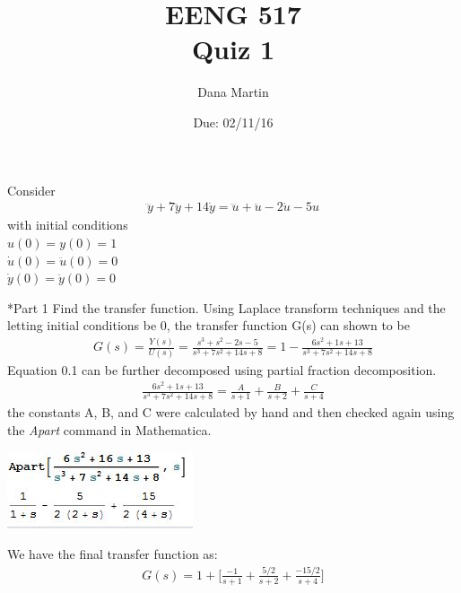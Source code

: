 \documentclass[paper=a4, fontsize=11pt]{scrartcl} %
\title{	
\normalfont \normalsize 
\textsc{EENG 517}\\ 
\huge Quiz 1 \\ %
}
\author{Dana Martin} %
\date{\normalsize Due: 02/11/16}
\numberwithin{equation}{section} %
\numberwithin{figure}{section} %
\numberwithin{table}{section} %
\begin{document}
\maketitle %

Consider 
\begin{align*}
\dddot{y}+7\ddot{y}+14\dot{y}=\dddot{u}+\ddot{u}-2\dot{u}-5u
\end{align*}
with initial conditions\\
$u(0)=y(0)=1$\\
$\dot{u}(0)=\ddot{u}(0)=0$\\
$\dot{y}(0)=\ddot{y}(0)=0$\\
\newline
\begin{section}*{Part 1}
Find the transfer function.
\newline
Using Laplace transform techniques and the letting initial conditions be 0, the transfer function G(s) can shown to be
\begin{align}
G(s)=\frac{Y(s)}{U(s)}=\frac{s^3+s^2-2s-5}{s^3+7s^2+14s+8}=1-\frac{6s^2+1s+13}{s^3+7s^2+14s+8}
\end{align}
Equation 0.1 can be further decomposed using partial fraction decomposition.
\begin{align}
\frac{6s^2+1s+13}{s^3+7s^2+14s+8}=\frac{A}{s+1}+\frac{B}{s+2}+\frac{C}{s+4}
\end{align}
the constants A, B, and C were calculated by hand and then checked again using the \textit{Apart} command in Mathematica.\\
\begin{center}
{\includegraphics{Image1}}
\end{center}
We have the final transfer function as:\\
\begin{align}
G(s)=1+\bigg[\frac{-1}{s+1}+\frac{5/2}{s+2}+\frac{-15/2}{s+4}\bigg]
\end{align}
\end{section}
\end{document}
